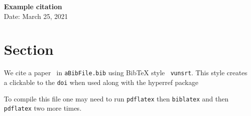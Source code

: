 \documentclass[10pt]{article}
\begin{document}
\begin{center}
{\bf Example citation} \\
    Date: March 25, 2021
\end{center}


\section{Section}

We cite a paper~\cite{AuthorYear} in {\tt aBibFile.bib} using BibTeX style {\tt
vunsrt}. This style creates a clickable to the {\tt doi} when used along with
the hyperref package 

To compile this file one may need to run {\tt pdflatex} then {\tt biblatex} and
then {\tt pdflatex} two more times.




\end{document}
